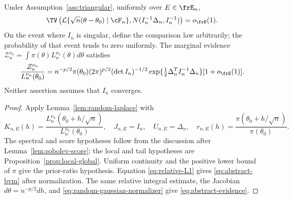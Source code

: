 \begin{theorem}
\label{thm:abstract-bvm}
Under Assumption~\ref{ass:triangular}, uniformly over \(E\in\frE_n\),
\begin{equation}
 \TV\left(
 \mathcal L\{\sqrt n(\theta-\theta_0)\mid\cF_n\},
 N(I_n^{-1}\Delta_n,I_n^{-1})
 \right)=o_{\frE}(1).
 \label{eq:abstract-bvm}
\end{equation}
On the event where \(I_n\) is singular, define the comparison law
arbitrarily; the probability of that event tends to zero uniformly.  The
marginal evidence \(\mathcal Z_n^{\nu_n}=\int\pi(\theta)
L_n^{\nu_n}(\theta)d\theta\) satisfies
\begin{equation}
 \frac{\mathcal Z_n^{\nu_n}}{L_n^{\nu_n}(\theta_0)}
 =n^{-p/2}\pi(\theta_0)(2\pi)^{p/2}(\det I_n)^{-1/2}
 \exp\{\tfrac12\Delta_n^TI_n^{-1}\Delta_n\}
 [1+o_{\frE}(1)].
 \label{eq:abstract-evidence}
\end{equation}
Neither assertion assumes that \(I_n\) converges.
\end{theorem}

\begin{proof}
Apply Lemma~\ref{lem:random-laplace} with
\[
 K_{n,E}(h)=
 \frac{L_n^{\nu_n}(\theta_0+h/\sqrt n)}
      {L_n^{\nu_n}(\theta_0)},
 \quad J_{n,E}=I_n,\quad U_{n,E}=\Delta_n,\quad
 r_{n,E}(h)=\frac{\pi(\theta_0+h/\sqrt n)}{\pi(\theta_0)}.
\]
The spectral and score hypotheses follow from the discussion after
Lemma~\ref{lem:sobolev-score}; the local and tail hypotheses are
Proposition~\ref{prop:local-global}.  Uniform continuity and the positive
lower bound of \(\pi\) give the prior-ratio hypothesis.  Equation
\eqref{eq:relative-L1} gives \eqref{eq:abstract-bvm} after normalization.
The same relative integral estimate, the Jacobian
\(d\theta=n^{-p/2}dh\), and
\eqref{eq:random-gaussian-normalizer} give
\eqref{eq:abstract-evidence}.
\end{proof}
